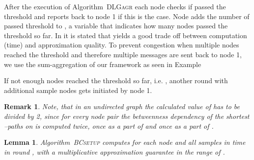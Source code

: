 \documentclass[11pt]{article}
\newtheorem{lemma}[theorem]{Lemma}
\newtheorem{remark}[theorem]{Remark}
\newif\iffull
\newif\ifshort
\begin{document}
\iffull
\begin{algorithm}[htb]
\begin{algorithmic}[1]
\STATE \COMMENT{INITIALIZATION} 
\STATE \textbf{global} ; \COMMENT{ := dependency of the source vertex s on u.} \newline

\STATE \COMMENT{COMPUTATION, :  root node ID of the message,  message of a child in }
\STATE ;
\STATE ;\label{line:dep1bc}
\STATE ;\label{line:depbc}
\STATE ; \label{line:sumsbc}
\STATE ; \COMMENT{output}
\end{algorithmic}
\caption{}
\label{alg:BC_g}
\vspace*{0.5cm}
\end{algorithm}
\fi

After the execution of Algorithm\iffull~\ref{alg:DLGagr}\fi~\textsc{DLGagr} each node checks \iffull in Line \ref{line:BCcheck}\fi if  passed the threshold  and reports back to node 1 if this is the case. Node  adds the number of passed threshold to , a variable that indicates how many nodes passed the threshold so far. In \cite{bader:2007:BCapprox} it is stated that  yields a good trade off between computation (time) and approximation quality. To prevent congestion when multiple nodes reached the threshold and therefore multiple messages are sent back to node 1, we use the sum-aggregation of our framework as seen in Example
\ifshort
 \ref{FULL:ex:sumval}.
\fi
\iffull
 \ref{ex:sumval}.
\fi

If not enough nodes reached the threshold so far, i.e. , another round with additional sample nodes gets initiated by node 1.

\begin{remark}
Note, that in an undirected graph the calculated value of  has to be divided by 2, since for every node pair  the betweenness dependency of the shortest --paths on  is computed twice, once as a part of  and once as a part of .
\end{remark}


\begin{lemma}
Algorithm\iffull~\ref{alg:BC_setup_controlling}\fi~\textsc{BCsetup} computes  for each node  and all samples  in time  in round , with a multiplicative approximation guarantee in the range of . 
\label{lemma:deproundapprox}
\end{lemma}
\ifshort
This is a key-lemma within the proof of Theorem \ref{theo:bcapprox} and we state the full proof in Appendix~\ref{sec:algBC}.
\fi
\end{document}
